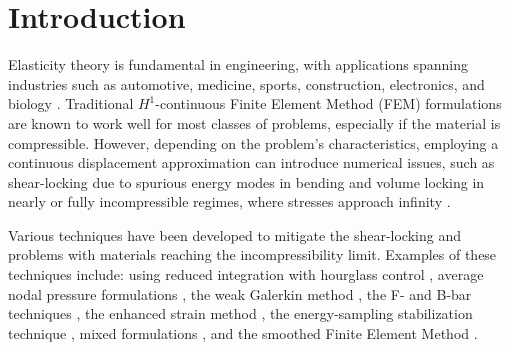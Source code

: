 \documentclass[english,11pt,3p,number,sort&compress]{elsarticle}
\begin{document}
\section{Introduction}

Elasticity theory is fundamental in engineering, with applications spanning industries such as automotive, medicine, sports, construction, electronics, and biology \cite{banks2011brief, li2021topological, naddeo2021degradable, ferrari2022effect, sanfilippo2024revolutionising, mousavi2022experimental, weakley2022putting, mashaly2011evaluation, semnani2011advances, gosling2013analysis, edlund2009model, pan2023research, tian2024elastic, santos2025self, leonardi2024deeper}. Traditional  $H^1$-continuous Finite Element Method (FEM) formulations are known to work well for most classes of problems, especially if the material is compressible. However, depending on the problem's characteristics, employing a continuous displacement approximation can introduce numerical issues, such as shear-locking due to spurious energy modes in bending \cite{bletzinger2000unified,belytschko1985stress} and volume locking in nearly or fully incompressible regimes, where stresses approach infinity \cite{neto2005f,cervera2003mixed}.

Various techniques have been developed to mitigate the shear-locking and problems with materials reaching the incompressibility limit. Examples of these techniques include: using reduced integration with hourglass control \cite{koh1987new, hutter2000total}, average nodal pressure formulations \cite{bonet1998simple, andrade2004assessment}, the weak Galerkin method \cite{lin2018weak,wang2024lowest,harper2019lowest}, the F- and B-bar techniques \cite{de1996design, neto2005f}, the enhanced strain method \cite{lovadina2003enhanced, de1995remarks}, the energy-sampling stabilization technique \cite{sivapuram2019energy, pakravan2017mean}, mixed formulations \cite{brezzi2012mixed,arnold1988new,taylor1973numerical}, and the smoothed Finite Element Method \cite{lee2020linear, jiang2018sharp}. 

\end{document}

